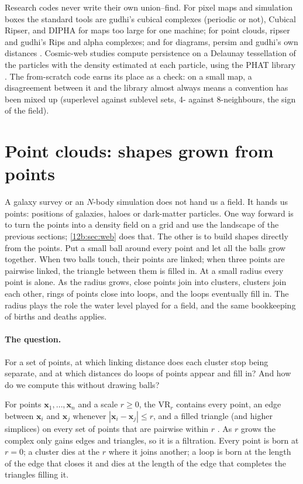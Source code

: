 \begin{inpractice}
Research codes never write their own union--find. For pixel maps and simulation boxes the standard tools are
gudhi's cubical complexes (periodic or not), Cubical Ripser, and DIPHA for maps too large for one machine; for point
clouds, ripser and gudhi's Rips and alpha complexes; and for diagrams, persim and gudhi's own distances
\cite{Otter2017}. Cosmic-web studies compute persistence on a Delaunay tessellation of the particles with the
density estimated at each particle, using the PHAT library \cite{Pranav2017,Wilding2021}. The from-scratch code
earns its place as a check: on a small map, a disagreement between it and the library almost always means a
convention has been mixed up (superlevel against sublevel sets, 4- against 8-neighbours, the sign of the field).
\end{inpractice}
\section{Point clouds: shapes grown from points}
\label{12b:sec:points}

A galaxy survey or an $N$-body simulation does not hand us a field. It hands us points: positions of galaxies,
haloes or dark-matter particles. One way forward is to turn the points into a density field on a grid and use
the landscape of the previous sections; \cref{12b:sec:web} does that. The other is to build shapes directly from
the points. Put a small ball around every point and let all the balls grow together. When two balls touch, their
points are linked; when three points are pairwise linked, the triangle between them is filled in. At a small
radius every point is alone. As the radius grows, close points join into clusters, clusters join each other, rings
of points close into loops, and the loops eventually fill in. The radius plays the role the water level played
for a field, and the same bookkeeping of births and deaths applies.

\paragraph{The question.} For a set of points, at which linking distance does each cluster stop being separate,
and at which distances do loops of points appear and fill in? And how do we compute this without drawing balls?

\begin{workdef}
For points $\bm x_1,\dots,\bm x_n$ and a scale $r\geq0$, the  $\mathrm{VR}_r$
contains every point, an edge between $\bm x_i$ and $\bm x_j$ whenever $|\bm x_i-\bm x_j|\leq r$, and a filled
triangle (and higher simplices) on every set of points that are pairwise within $r$ . As $r$ grows the complex only gains edges and triangles, so it is a
filtration. Every point is born at $r=0$; a cluster dies at the $r$ where it joins another; a loop is born at the
length of the edge that closes it and dies at the length of the edge that completes the triangles filling it.
\end{workdef}

